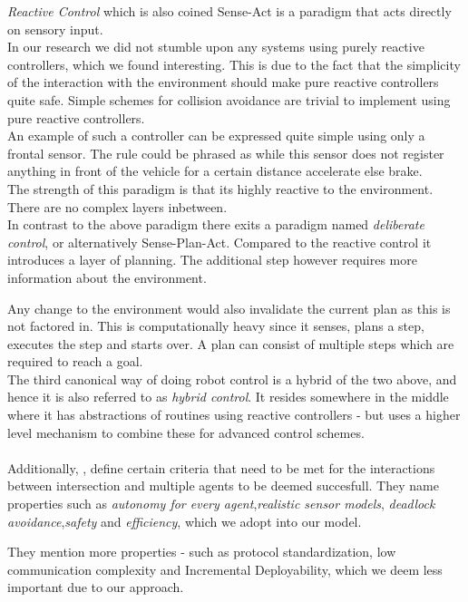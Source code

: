 \textit{Reactive Control} which is also coined Sense-Act is a paradigm that acts directly on sensory input.\\
In our research we did not stumble upon any systems using purely reactive controllers, which we found interesting. This is due to the fact that the simplicity of the interaction with the environment should make pure reactive controllers quite safe.
Simple schemes for collision avoidance are trivial to implement using pure reactive controllers.\\
An example of such a controller can be expressed quite simple using only a frontal sensor. The rule could be phrased as while this sensor does not register anything in front of the vehicle for a certain distance accelerate else brake.\\
The strength of this paradigm is that its highly reactive to the environment. There are no complex layers inbetween.\\

In contrast to the above paradigm there exits a paradigm named \textit{deliberate control}, or alternatively Sense-Plan-Act.
Compared to the reactive control it introduces a layer of planning.
The additional step however requires more information about the environment.

Any change to the environment would also invalidate the current plan as this is not factored in.
This is computationally heavy since it senses, plans a step, executes the step and starts over.
A plan can consist of multiple steps which are required to reach a goal.\\

The third canonical way of doing robot control is a hybrid of the two above, and hence it is also referred to as \textit{hybrid control}.
It resides somewhere in the middle where it has abstractions of routines using reactive controllers - but uses a higher level mechanism to combine these for advanced control schemes.\\


\\

Additionally, \citeauthor{texas}, define certain criteria that need to be met for the interactions between intersection and multiple agents to be deemed succesfull.
They name properties such as \textit{autonomy for every agent},\textit{realistic sensor models}, \textit{deadlock avoidance},\textit{safety} and \textit{efficiency}, which we adopt into our model.

They mention more properties - such as protocol standardization, low communication complexity and Incremental Deployability, which we deem less important due to our approach.